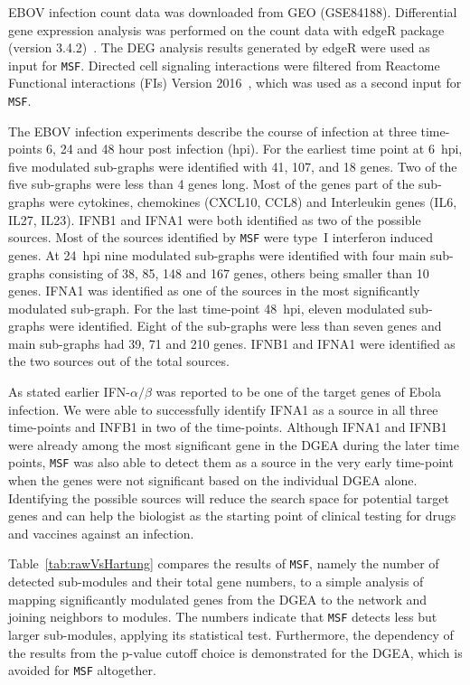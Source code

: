 \documentclass[10pt,a4paper,twocolumn]{article}
\begin{document}
EBOV infection count data was downloaded from GEO (GSE84188). Differential
gene expression analysis was performed on the count data with edgeR package
(version 3.4.2)~\cite{edgeR}. The DEG analysis results generated by edgeR
were used as input for \texttt{MSF}. Directed cell signaling interactions
were filtered from Reactome Functional interactions (FIs) Version
2016~\cite{Cytokegg}, which was used as a second input for \texttt{MSF}.

The EBOV infection experiments describe the course of infection at three
time-points 6, 24 and 48 hour post infection (hpi). For the earliest time
point at 6~hpi, five modulated sub-graphs were identified with 41, 107, and
18 genes. Two of the five sub-graphs were less than 4 genes long. Most of
the genes part of the sub-graphs were cytokines, chemokines (CXCL10, CCL8)
and Interleukin genes (IL6, IL27, IL23). IFNB1 and IFNA1 were both identified as two of the
possible sources. Most of the sources identified by \texttt{MSF} were
type~I interferon induced genes. At 24~hpi nine modulated sub-graphs were
identified with four main sub-graphs consisting
of 38, 85, 148 and 167 genes, others being smaller than 10 genes. IFNA1 was identified as one of the sources in
the most significantly modulated sub-graph. For the last time-point 48~hpi,
eleven modulated sub-graphs were identified. Eight of the sub-graphs were
less than seven genes and main sub-graphs had 39, 71 and 210 genes. IFNB1
and IFNA1 were identified as the two sources out of the total sources.

As stated earlier IFN-$\alpha / \beta$ was reported to be one of the target
genes of Ebola infection. We were able to successfully identify IFNA1 as a
source in all three time-points and INFB1 in two of the
time-points. Although IFNA1 and IFNB1 were already among the most
significant gene in the DGEA during the later time points, \texttt{MSF} was
also able to detect them as a source in the very early time-point when the
genes were not significant based on the individual DGEA alone. Identifying
the possible sources will reduce the search space for potential target
genes and can help the biologist as the starting point of clinical testing
for drugs and vaccines against an infection.

Table~\ref{tab:rawVsHartung} compares the results of \texttt{MSF}, namely
the number of detected sub-modules and their total gene numbers, to a
simple analysis of mapping significantly modulated genes from the DGEA to
the network and joining neighbors to modules. The numbers indicate that
\texttt{MSF} detects less but larger sub-modules, applying its statistical
test.  Furthermore, the dependency of the results from the p-value cutoff
choice is demonstrated for the DGEA, which is avoided for \texttt{MSF}
altogether.
\end{document}
